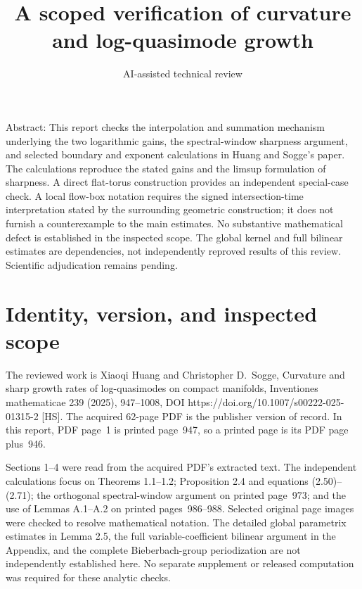\documentclass[10pt]{article}
\title{A scoped verification of curvature and log-quasimode growth}
\author{AI-assisted technical review}
\date{}
\begin{document}
\maketitle
Abstract: This report checks the interpolation and summation mechanism underlying the two logarithmic gains, the spectral-window sharpness argument, and selected boundary and exponent calculations in Huang and Sogge’s paper. The calculations reproduce the stated gains and the limsup formulation of sharpness. A direct flat-torus construction provides an independent special-case check. A local flow-box notation requires the signed intersection-time interpretation stated by the surrounding geometric construction; it does not furnish a counterexample to the main estimates. No substantive mathematical defect is established in the inspected scope. The global kernel and full bilinear estimates are dependencies, not independently reproved results of this review. Scientific adjudication remains pending.\par
\section*{Identity, version, and inspected scope}
The reviewed work is Xiaoqi Huang and Christopher D. Sogge, Curvature and sharp growth rates of log-quasimodes on compact manifolds, Inventiones mathematicae 239 (2025), 947–1008, DOI https://doi.org/10.1007/s00222-025-01315-2 [HS]. The acquired 62-page PDF is the publisher version of record. In this report, PDF page 1 is printed page 947, so a printed page is its PDF page plus 946.\par
Sections 1–4 were read from the acquired PDF’s extracted text. The independent calculations focus on Theorems 1.1–1.2; Proposition 2.4 and equations (2.50)–(2.71); the orthogonal spectral-window argument on printed page 973; and the use of Lemmas A.1–A.2 on printed pages 986–988. Selected original page images were checked to resolve mathematical notation. The detailed global parametrix estimates in Lemma 2.5, the full variable-coefficient bilinear argument in the Appendix, and the complete Bieberbach-group periodization are not independently established here. No separate supplement or released computation was required for these analytic checks.\par
\end{document}
